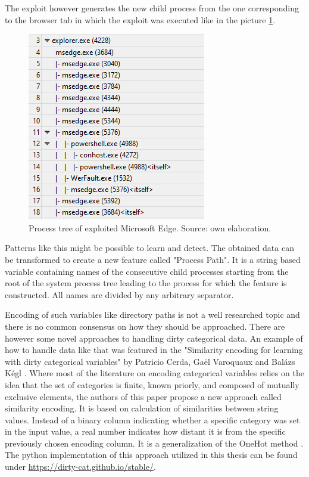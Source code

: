 \documentclass[a4paper,twoside,12pt]{book}
\begin{document}
The exploit however generates the new child process from the one corresponding to the browser tab 
in which the exploit was executed like in the picture \ref{fig:WPAexploit}. 

\begin{figure}
	\centering
	\includegraphics{images/wpa_exploit}
	\caption{Process tree of exploited Microsoft Edge. Source: own elaboration.}
	\label{fig:WPAexploit}
 \end{figure}

Patterns like this might be possible to learn and detect. The obtained data can be transformed
to create a new feature called "Process Path". It is a string based variable containing names 
of the consecutive child processes starting from the root of the system process tree leading to the 
process for which the feature is constructed. All names are divided by any arbitrary separator. 

Encoding of such variables like directory paths is not a well researched topic and there is no 
common consensus on how they should be approached. There are however some novel approaches to 
handling dirty categorical data. An example of how to handle data like that was featured in the 
"Similarity encoding for learning with dirty categorical variables" by Patricio Cerda,  Ga{\"e}l 
Varoquaux and Bal{\'a}zs K{\'e}gl \cite{bib:dirtycat}. Where most of the literature on encoding categorical variables 
relies on the idea that the set of categories is finite, known priorly, and composed of mutually 
exclusive elements, the authors of this paper propose a new approach called similarity encoding. 
It is based on calculation of similarities between string values. Instead of a binary column 
indicating whether a specific category was set in the input value, a real number indicates how 
distant it is from the specific previously chosen encoding column. It is a generalization of the 
OneHot method \cite{bib:dirtycat}. The python implementation of this approach utilized in this thesis 
can be found under \url{https://dirty-cat.github.io/stable/}.
\end{document}
